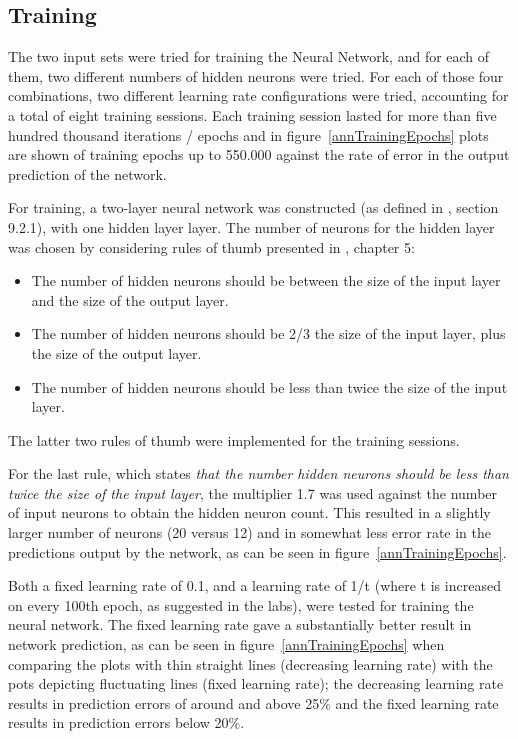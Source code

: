 \documentclass[conference]{IEEEtran}
\begin{document}
\subsection{Training}
The two input sets were tried for training the Neural Network, and for each of them, two different numbers of hidden neurons were tried.  For each of those four combinations, two different learning rate configurations were tried, accounting for a total of eight training sessions.  Each training session lasted for more than five hundred thousand iterations / epochs and in figure~\ref{annTrainingEpochs} plots are shown of training epochs up to 550.000 against the rate of error in the output prediction of the network.

For training, a two-layer neural network was constructed (as defined in \cite{Han:2005:DMC:1076797}, section 9.2.1), with one hidden layer layer.  The number of neurons for the hidden layer was chosen by considering rules of thumb presented in \cite{heaton2008introduction}, chapter 5:
\begin{itemize}
	\item The number of hidden neurons should be between the size of the input layer and the size of the output layer.
	\item The number of hidden neurons should be 2/3 the size of the input layer, plus the size of the output layer.
	\item The number of hidden neurons should be less than twice the size of the input layer.
\end{itemize}

The latter two rules of thumb were implemented for the training sessions.  

For the last rule, which states \textit{that the number hidden neurons should be less than twice the size of the input layer}, the multiplier 1.7 was used against the number of input neurons to obtain the hidden neuron count.  This resulted in a slightly larger number of neurons (20 versus 12) and in somewhat less error rate in the predictions output by the network, as can be seen in figure~\ref{annTrainingEpochs}.

Both a fixed learning rate of 0.1, and a learning rate of 1/t (where t is increased on every 100th epoch, as suggested in the labs), were tested for training the neural network.  The fixed learning rate gave a substantially better result in network prediction, as can be seen in figure~\ref{annTrainingEpochs} when comparing the plots with thin straight lines (decreasing learning rate) with the pots depicting fluctuating lines (fixed learning rate); the decreasing learning rate results in prediction errors of around and above 25\% and the fixed learning rate results in prediction errors below 20\%.
\end{document}
